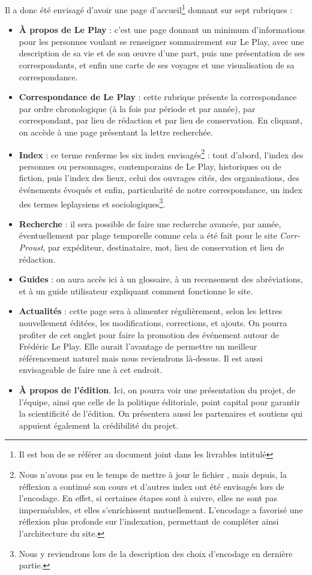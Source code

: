 Il a donc été envisagé d'avoir une page d'accueil\footnote{Il est bon de se référer au document joint dans les livrables intitulé } donnant sur sept rubriques : 
\begin{itemize}
    \item \textbf{À propos de Le Play} : c'est une page donnant un minimum d'informations pour les personnes voulant se renseigner sommairement sur Le Play, avec une description de sa vie et de son \oe uvre d'une part, puis une présentation de ses correspondants, et enfin une carte de ses voyages et une visualisation de sa correspondance.
    \item \textbf{Correspondance de Le Play }: cette rubrique présente la correspondance par ordre chronologique (à la fois par période et par année), par correspondant, par lieu de rédaction et par lieu de conservation. En cliquant, on accède à une page présentant la lettre recherchée.
    \item \textbf{Index} : ce terme renferme les six index envisagés\footnote{Nous n'avons pas eu le temps de mettre à jour le fichier , mais depuis, la réflexion a continué son cours et d'autres index ont été envisagés lors de l'encodage. En effet, si certaines étapes sont à suivre, elles ne sont pas imperméables, et elles s'enrichissent mutuellement. L'encodage a favorisé une réflexion plus profonde sur l'indexation, permettant de compléter ainsi l'architecture du site.} : tout d'abord, l'index des personnes ou personnages, contemporains de Le Play, historiques ou de fiction, puis l'index des lieux, celui des ouvrages cités, des organisations, des événements évoqués et enfin, particularité de notre correspondance, un index des termes leplaysiens et sociologiques\footnote{Nous y reviendrons lors de la description des choix d'encodage en dernière partie.}. 
    \item \textbf{Recherche} : il sera possible de faire une recherche avancée, par année, éventuellement par plage temporelle comme cela a été fait pour le site \emph{Corr-Proust}, par expéditeur, destinataire, mot, lieu de conservation et lieu de rédaction.
    \item \textbf{Guides }: on aura accès ici à un glossaire, à un recensement des abréviations, et à un guide utilisateur expliquant comment fonctionne le site. 
    \item \textbf{Actualités} : cette page sera à alimenter régulièrement, selon les lettres nouvellement éditées, les modifications, corrections, et ajouts. On pourra profiter de cet onglet pour faire la promotion des événement autour de Frédéric Le Play. Elle aurait l'avantage de permettre un meilleur référencement naturel mais nous reviendrons là-dessus. Il est aussi envisageable de faire une  à cet endroit.
    \item \textbf{À propos de l'édition}. Ici, on pourra voir une présentation du projet, de l'équipe, ainsi que celle de la politique éditoriale, point capital pour garantir la scientificité de l'édition. On présentera aussi les partenaires et soutiens qui appuient également la crédibilité du projet.
\end{itemize}

